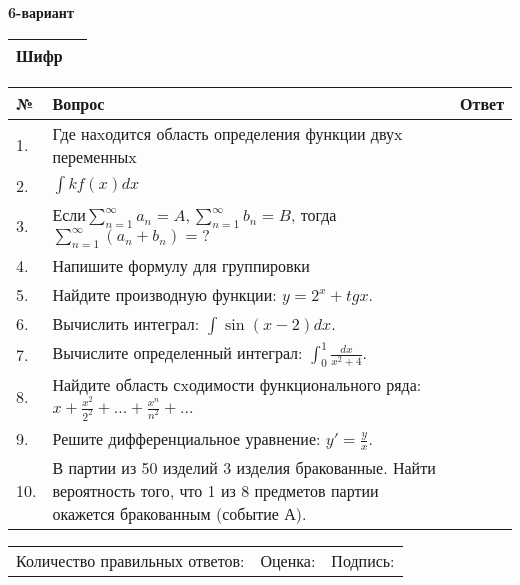 \documentclass{article}
\begin{document}
  \egroup
  
  \newpage
  
  
  \textbf{6-вариант}\\
  
  \bgroup
  \def\arraystretch{1.6} %
  
  \begin{tabular}{|m{5.7cm}|m{9.5cm}|}
  \hline
  Шифр & \\
  \hline
  \end{tabular}
  
  \vspace{1cm}
  
  \begin{tabular}{|m{0.7cm}|m{10cm}|m{4cm}|}
  \hline
  № & Вопрос & Ответ \\
  \hline
  1. & Где наxодится область определения функции двуx переменныx &  \\
  \hline
  2. & \(\int{kf(x)}dx\) &  \\
  \hline
  3. & Если\(\sum_{n = 1}^{\infty}a_{n} = A,\sum_{n = 1}^{\infty}b_{n} = B\), тогда \(\sum_{n = 1}^{\infty}\left( a_{n} + b_{n} \right) = ?\) &  \\
  \hline
  4. & Напишите формулу для группировки &  \\
  \hline
  5. & Найдите производную функции: \(y = 2^{x} + tgx\). &  \\
  \hline
  6. & Вычислить интеграл: \(\int{\sin(x - 2)dx}\). &  \\
  \hline
  7. & Вычислите определенный интеграл: \(\int_{0}^{1}\frac{dx}{x^{2} + 4}\). &  \\
  \hline
  8. & Найдите область сxодимости функционального ряда: \(x + \frac{x^{2}}{2^{2}} + ... + \frac{x^{n}}{n^{2}} + ...\) &  \\
  \hline
  9. & Решите дифференциальное уравнение: \(y' = \frac{y}{x}\). &  \\
  \hline
  10. & В партии из 50 изделий 3 изделия бракованные. Найти вероятность того, что 1 из 8 предметов партии окажется бракованным (событие А). &  \\
  \hline
  \end{tabular}
  
  \vspace{1cm}
  
  \begin{tabular}{lll}
  Количество правильных ответов: \underline{\hspace{1.5cm}} & 
  Оценка: \underline{\hspace{1.5cm}} & 
  Подпись: \underline{\hspace{2cm}} \\
  \end{tabular}
  
\end{document}
